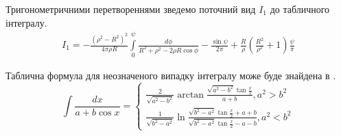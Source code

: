 Тригонометричними перетвореннями зведемо поточний вид $ I_1 $ до табличного 
інтегралу.
%
\begin{equation*} \begin{aligned}
I_1 = - \frac{\left( \rho^2 - R^2 \right)^2}{4 \pi \rho R} 
\int \limits_{0}^{\psi} \frac{d \phi}{R^2 + \rho^2 - 2 \rho R \cos \phi} - 
\frac{\sin \psi}{2 \pi} + \frac{R}{\rho} 
\left( \frac{R^2}{\rho^2} + 1 \right) \frac{\psi}{\pi}
\end{aligned} \end{equation*}

Таблична формула для неозначеного випадку інтегралу може буде знайдена в 
\cite[ст. 181]{ElementFunc1983}.
%
\begin{equation} \label{eq:caseTableIntegral}
\int \frac{d x}{a + b \cos{x}} = \begin{cases}
\frac{2}{\sqrt{a^2-b^2}} \arctan \frac{\sqrt{a^2-b^2} \tan \frac{x}{2}}
{a + b}, a^2 > b^2 \\
\frac{1}{\sqrt{b^2-a^2}} \ln 
\frac{\sqrt{b^2-a^2} \tan \frac{x}{2} + a + b}
{\sqrt{b^2-a^2} \tan \frac{x}{2} - a - b}, a^2 < b^2
\end{cases}
\end{equation}

